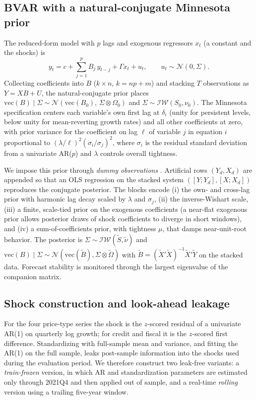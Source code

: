 \documentclass[conference]{IEEEtran}
\begin{document}
\subsection{BVAR with a natural-conjugate Minnesota prior}
The reduced-form model with $p$ lags and exogenous regressors $x_t$ (a constant
and the shocks) is
\begin{equation}
y_t = c + \sum_{j=1}^{p} B_j\,y_{t-j} + \Gamma x_t + u_t,
\qquad u_t \sim \mathcal{N}(0,\Sigma).
\end{equation}
Collecting coefficients into $B$ ($k\times n$, $k=np+m$) and stacking
$T$ observations as $Y=XB+U$, the natural-conjugate prior places
$\mathrm{vec}(B)\mid\Sigma \sim \mathcal{N}(\mathrm{vec}(B_0),\,\Sigma\otimes\Omega_0)$
and $\Sigma\sim\mathcal{IW}(S_0,\nu_0)$. The Minnesota specification
\cite{litterman1986} centers each variable's own first lag at $\delta_i$
(unity for persistent levels, below unity for mean-reverting growth rates) and
all other coefficients at zero, with prior variance for the coefficient on lag
$\ell$ of variable $j$ in equation $i$ proportional to
$(\lambda/\ell)^2(\sigma_i/\sigma_j)^2$, where $\sigma_i$ is the residual
standard deviation from a univariate AR($p$) and $\lambda$ controls overall
tightness.

We impose this prior through \emph{dummy observations} \cite{bgr2010,sims1998}.
Artificial rows $(Y_d,X_d)$ are appended so that an OLS regression on the stacked
system $([Y;Y_d],[X;X_d])$ reproduces the conjugate posterior. The blocks encode
(i) the own- and cross-lag prior with harmonic lag decay scaled by $\lambda$ and
$\sigma_j$, (ii) the inverse-Wishart scale, (iii) a finite, scale-tied prior on
the exogenous coefficients (a near-flat exogenous prior allows posterior draws of
shock coefficients to diverge in short windows), and (iv) a sum-of-coefficients
prior, with tightness $\mu$, that damps near-unit-root behavior. The posterior is
$\Sigma\sim\mathcal{IW}(\tilde S,\tilde\nu)$ and
$\mathrm{vec}(B)\mid\Sigma\sim\mathcal{N}(\mathrm{vec}(\tilde B),\Sigma\otimes\tilde\Omega)$
with $\tilde B=(\tilde X'\tilde X)^{-1}\tilde X'\tilde Y$ on the stacked data.
Forecast stability is monitored through the largest eigenvalue of the companion
matrix.

\subsection{Shock construction and look-ahead leakage}
For the four price-type series the shock is the $z$-scored residual of a
univariate AR(1) on quarterly log growth; for credit and fiscal it is the
$z$-scored first difference. Standardizing with full-sample mean and variance,
and fitting the AR(1) on the full sample, leaks post-sample information into the
shocks used during the evaluation period. We therefore construct two leak-free
variants: a \emph{train-frozen} version, in which AR and standardization
parameters are estimated only through 2021Q4 and then applied out of sample, and
a real-time \emph{rolling} version using a trailing five-year window.
\end{document}
